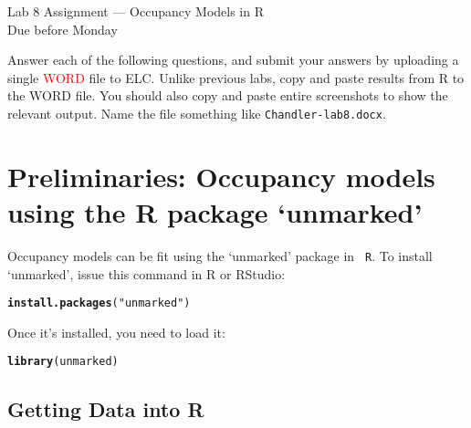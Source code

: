 \documentclass[12pt]{article}\usepackage[]{graphicx}\usepackage[]{color}
\makeatletter
\newcommand{\hlstr}[1]{\textcolor[rgb]{0.192,0.494,0.8}{#1}}%
\newcommand{\hlstd}[1]{\textcolor[rgb]{0.345,0.345,0.345}{#1}}%
\newcommand{\hlkwd}[1]{\textcolor[rgb]{0.737,0.353,0.396}{\textbf{#1}}}%
\newenvironment{kframe}{%
 \def\at@end@of@kframe{}%
 \ifinner\ifhmode%
  \def\at@end@of@kframe{\end{minipage}}%
  \begin{minipage}{\columnwidth}%
 \fi\fi%
 \def\FrameCommand##1{\hskip\@totalleftmargin \hskip-\fboxsep
 \colorbox{shadecolor}{##1}\hskip-\fboxsep
     \hskip-\linewidth \hskip-\@totalleftmargin \hskip\columnwidth}%
 \MakeFramed {\advance\hsize-\width
   \@totalleftmargin\z@ \linewidth\hsize
   \@setminipage}}%
 {\par\unskip\endMakeFramed%
 \at@end@of@kframe}
\newenvironment{knitrout}{}{} %
\makeatother
\begin{document}
{
  \Large
  \centering
  Lab 8 Assignment --- Occupancy Models in R \\
  Due before Monday \par
}

\vspace{10pt}


Answer each of the following questions, and submit your answers by 
uploading a single \textcolor{red}{WORD} file to ELC. Unlike previous labs,
copy and paste results from R to the WORD file. You should
also copy and paste entire screenshots to show the relevant output. Name  
the file something like \texttt{Chandler-lab8.docx}.  




\section*{\normalsize Preliminaries: Occupancy models using the R
package `unmarked'}


Occupancy models can be fit using the `unmarked' package in {\tt
R}. To install `unmarked', issue this command in R or RStudio: 

\begin{knitrout}
\color{fgcolor}\begin{kframe}
\begin{alltt}
\hlkwd{install.packages}\hlstd{(}\hlstr{"unmarked"}\hlstd{)}
\end{alltt}
\end{kframe}
\end{knitrout}

Once it's installed, you need to load it:

\begin{knitrout}
\color{fgcolor}\begin{kframe}
\begin{alltt}
\hlkwd{library}\hlstd{(unmarked)}
\end{alltt}
\end{kframe}
\end{knitrout}



\subsection*{\normalsize Getting Data into R}
\vspace{-10pt}
\end{document}
